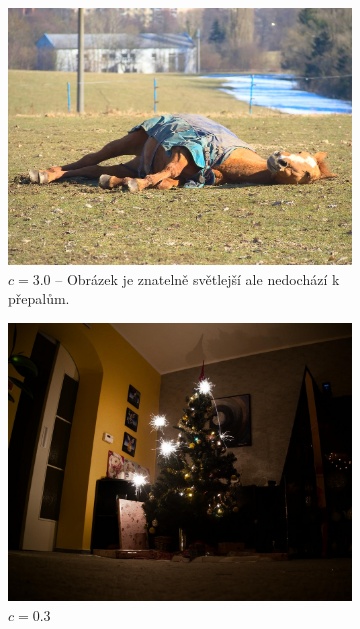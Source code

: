 \documentclass[11pt, a4paper, titlepage]{article}
\begin{document}
\begin{figure}[h]
\begin{subfigure}[t]{0.25\textwidth}
        \vskip 0pt
        \includegraphics[width=1.0\textwidth]{horse_mul_luma_up.jpg}
        \caption{$c = 3.0$ -- Obrázek je znatelně světlejší ale nedochází k přepalům.}
    \end{subfigure}
    \begin{subfigure}[t]{0.25\textwidth}
        \vskip 0pt
        \includegraphics[width=1.0\textwidth]{tree_luma_mult_down.jpg}
        \caption{$c = 0.3$}
    \end{subfigure}
    \hspace{1cm}
    \begin{subfigure}[t]{0.25\textwidth}
        \vskip 0pt

\end{subfigure}
\end{figure}
\end{document}
